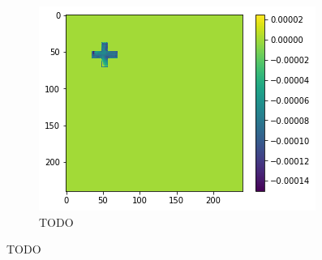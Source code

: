 \begin{figure}[H]
\begin{subfigure}[t]{.33\textwidth}
        \centering
        \includegraphics[width=\linewidth]{chapters/06_hdm/images_analyze/1c_diff.png}
        \caption{TODO}
    \end{subfigure}
    \caption{TODO}
\end{figure}

